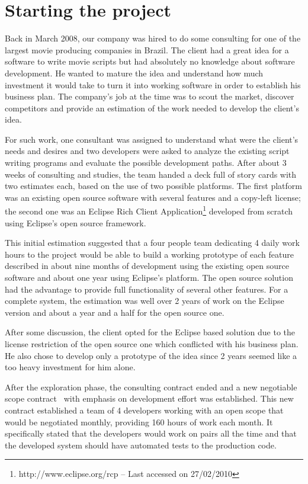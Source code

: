 \documentclass[lnbip]{svmultln}
\begin{document}
\section{Starting the project}
\label{sec:start}

Back in March 2008, our company was hired to do some consulting for
one of the largest movie producing companies in Brazil. The client had
a great idea for a software to write movie scripts but had absolutely
no knowledge about software development.  He wanted to mature the idea
and understand how much investment it would take to turn it into
working software in order to establish his business plan. The
company's job at the time was to scout the market, discover
competitors and provide an estimation of the work needed to develop
the client's idea.

For such work, one consultant was assigned to understand what were the
client's needs and desires and two developers were asked to analyze
the existing script writing programs and evaluate the possible
development paths. After about 3 weeks of consulting and studies, the
team handed a deck full of story cards with two estimates each, based
on the use of two possible platforms. The first platform was an
existing open source software with several features and a copy-left
license; the second one was an Eclipse Rich Client
Application\footnote{http://www.eclipse.org/rcp -- Last accessed on 27/02/2010}
developed from scratch using Eclipse's open source framework.

This initial estimation suggested that a four people team dedicating 4
daily work hours to the project would be able to build a working
prototype of each feature described in about nine months of
development using the existing open source software and about one year
using Eclipse's platform. The open source solution had the advantage
to provide full functionality of several other features. For a
complete system, the estimation was well over 2 years of work on the
Eclipse version and about a year and a half for the open source one.

After some discussion, the client opted for the Eclipse based solution
due to the license restriction of the open source one which conflicted
with his business plan. He also chose to develop only a prototype of
the idea since 2 years seemed like a too heavy investment for him
alone.

After the exploration phase, the consulting contract ended and a new
negotiable scope contract~\cite{XP}
with emphasis on development effort was established. This new contract
established a team of 4 developers working with an open scope that would
be negotiated monthly, providing 160 hours of work each month. It
specifically stated that the developers would work on pairs all the
time and that the developed system should have automated tests to the
production code.
\end{document}
